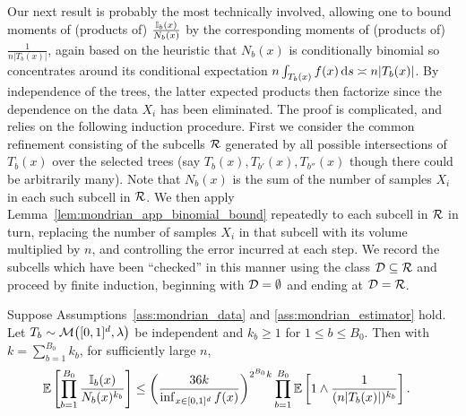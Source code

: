 Our next result is probably the most technically involved,
allowing one to bound moments of
(products of) $\frac{\mathbb{I}_b(x)}{N_b(x)}$ by the corresponding moments of
(products of) $\frac{1}{n |T_b(x)|}$, again based on the heuristic
that $N_b(x)$ is conditionally binomial so concentrates around
its conditional expectation
$n \int_{T_b(x)} f(x) \,\mathrm{d}s \asymp n |T_b(x)|$.
By independence of the trees,
the latter expected products then factorize
since the dependence on the data $X_i$ has been eliminated.
The proof is complicated, and relies on the following induction procedure.
First we consider the common refinement consisting of the
subcells $\mathcal{R}$ generated by all possible intersections
of $T_b(x)$ over the selected trees
(say $T_{b}(x), T_{b'}(x), T_{b''}(x)$
though there could be arbitrarily many).
Note that $N_b(x)$ is the sum of the number of
samples $X_i$ in each such subcell in $\mathcal{R}$.
We then apply Lemma~\ref{lem:mondrian_app_binomial_bound} repeatedly
to each subcell in $\mathcal{R}$ in turn, replacing
the number of samples $X_i$ in that subcell with its volume
multiplied by $n$, and controlling the error incurred at each step.
We record the subcells which have been ``checked'' in this manner
using the class $\mathcal{D} \subseteq \mathcal{R}$ and proceed by finite induction,
beginning with $\mathcal{D} = \emptyset$ and ending at $\mathcal{D} = \mathcal{R}$.

\begin{lemma}%
  \label{lem:mondrian_app_moment_denominator}

  Suppose Assumptions~\ref{ass:mondrian_data}
  and \ref{ass:mondrian_estimator} hold.
  Let $T_b \sim \mathcal{M}\big([0,1]^d, \lambda\big)$
  be independent and $k_b \geq 1$ for $1 \leq b \leq B_0$.
  Then with $k = \sum_{b=1}^{B_0} k_b$,
  for sufficiently large $n$,
  \begin{align*}
    \mathbb{E}\left[
      \prod_{b=1}^{B_0}
      \frac{\mathbb{I}_b(x)}{N_b(x)^{k_b}}
    \right]
    &\leq
    \left( \frac{36k}{\inf_{x \in [0,1]^d} f(x)} \right)^{2^{B_0} k}
    \prod_{b=1}^{B_0}
    \mathbb{E} \left[
      1 \wedge
      \frac{1}{(n |T_b(x)|)^{k_b}}
    \right].
  \end{align*}
\end{lemma}

